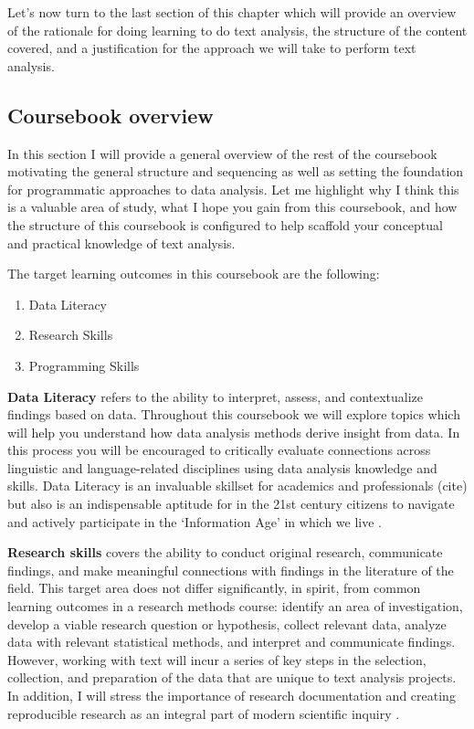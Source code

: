 \documentclass[
]{article}
\providecommand{\tightlist}{%
  \setlength{\itemsep}{0pt}\setlength{\parskip}{0pt}}
\begin{document}
Let's now turn to the last section of this chapter which will provide an overview of the rationale for doing learning to do text analysis, the structure of the content covered, and a justification for the approach we will take to perform text analysis.

\hypertarget{coursebook-overview}{%
\subsection{Coursebook overview}\label{coursebook-overview}}

In this section I will provide a general overview of the rest of the coursebook motivating the general structure and sequencing as well as setting the foundation for programmatic approaches to data analysis. Let me highlight why I think this is a valuable area of study, what I hope you gain from this coursebook, and how the structure of this coursebook is configured to help scaffold your conceptual and practical knowledge of text analysis.

The target learning outcomes in this coursebook are the following:

\begin{enumerate}
\def\labelenumi{\arabic{enumi}.}
\tightlist
\item
  Data Literacy
\item
  Research Skills
\item
  Programming Skills
\end{enumerate}

\textbf{Data Literacy} refers to the ability to interpret, assess, and contextualize findings based on data. Throughout this coursebook we will explore topics which will help you understand how data analysis methods derive insight from data. In this process you will be encouraged to critically evaluate connections across linguistic and language-related disciplines using data analysis knowledge and skills. Data Literacy is an invaluable skillset for academics and professionals (cite) but also is an indispensable aptitude for in the 21st century citizens to navigate and actively participate in the `Information Age' in which we live \citep{Carmi2020}.

\textbf{Research skills} covers the ability to conduct original research, communicate findings, and make meaningful connections with findings in the literature of the field. This target area does not differ significantly, in spirit, from common learning outcomes in a research methods course: identify an area of investigation, develop a viable research question or hypothesis, collect relevant data, analyze data with relevant statistical methods, and interpret and communicate findings. However, working with text will incur a series of key steps in the selection, collection, and preparation of the data that are unique to text analysis projects. In addition, I will stress the importance of research documentation and creating reproducible research as an integral part of modern scientific inquiry \citep{Buckheit1995}.
\end{document}
